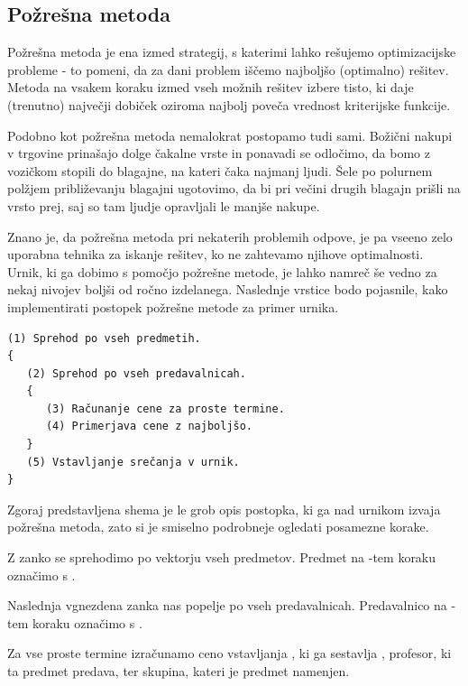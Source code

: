 \documentclass[10pt,a4paper]{article}
\begin{document}
\subsection{Požrešna metoda} %

Požrešna metoda je ena izmed strategij, s katerimi lahko rešujemo optimizacijske probleme -
to pomeni, da za dani problem iščemo najboljšo (optimalno) rešitev. Metoda na vsakem koraku
izmed vseh možnih rešitev izbere  tisto, ki daje (trenutno) največji dobiček oziroma najbolj
poveča vrednost kriterijske funkcije.

Podobno kot požrešna metoda nemalokrat postopamo tudi sami. Božični nakupi v trgovine
prinašajo dolge čakalne vrste in ponavadi se odločimo, da bomo z vozičkom stopili do blagajne,
na kateri čaka najmanj ljudi. Šele po polurnem polžjem približevanju blagajni ugotovimo,
da bi pri večini drugih blagajn prišli na vrsto prej, saj so tam ljudje opravljali le
manjše nakupe.

Znano je, da požrešna metoda pri nekaterih problemih odpove, je pa vseeno zelo uporabna
tehnika za iskanje rešitev, ko ne zahtevamo njihove optimalnosti. Urnik, ki ga dobimo s
pomočjo požrešne metode, je lahko namreč še vedno za nekaj nivojev boljši od ročno izdelanega.
Naslednje vrstice bodo pojasnile, kako implementirati postopek požrešne metode za primer urnika.

\begin{verbatim}
(1) Sprehod po vseh predmetih.
{
   (2) Sprehod po vseh predavalnicah.
   {
      (3) Računanje cene za proste termine.
      (4) Primerjava cene z najboljšo.
   }
   (5) Vstavljanje srečanja v urnik.
}
\end{verbatim}

Zgoraj predstavljena shema je le grob opis postopka, ki ga nad urnikom izvaja požrešna metoda,
zato si je smiselno podrobneje ogledati posamezne korake.

   Z zanko se sprehodimo po vektorju vseh predmetov. Predmet na -tem koraku
   označimo s .

   Naslednja vgnezdena zanka nas popelje po vseh predavalnicah. Predavalnico na
   -tem koraku označimo s .

   Za vse proste termine  izračunamo ceno vstavljanja
   , ki ga sestavlja , profesor, ki ta predmet predava,
   ter skupina, kateri je predmet namenjen.
\end{document}
